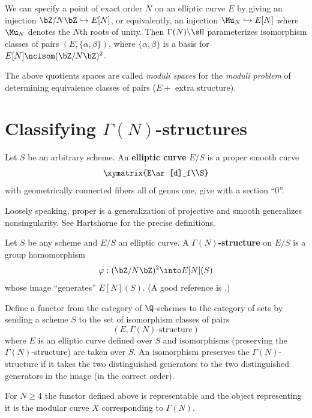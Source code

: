 \documentclass{report}
\begin{document}
We can specify a point of exact order $N$ on an elliptic curve $E$ by
giving an injection $\bZ/N\bZ\hookrightarrow E[N]$, or equivalently,
an injection $\Mu_N\hookrightarrow E[N]$ where $\Mu_N$ denotes the
$N$th roots of unity.  Then $\Gamma(N)\backslash\sH$ parameterizes
isomorphism classes of pairs $(E,\{\alpha,\beta\})$, where
$\{\alpha,\beta\}$ is a basis for $E[N]\ncisom(\bZ/N\bZ)^2$.

The above quotients spaces are called {\em moduli spaces} for the
{\em moduli problem} of determining equivalence classes of
pairs ($E + $ extra structure). 

\section{Classifying $\Gamma(N)$-structures}
\begin{defn}
Let $S$ be an arbitrary scheme. An {\bfseries elliptic curve}
$E/S$ is a proper smooth curve
$$\xymatrix{E\ar[d]_f\\S}$$
with geometrically connected fibers all of genus one, give with a
section ``0''.
\end{defn}

Loosely speaking, proper is a generalization of projective
and smooth generalizes nonsingularity. See
Hartshorne \cite[III.10]{hartshorne}
for the precise definitions.

\begin{defn}
Let $S$ be any scheme and $E/S$ an elliptic curve.
A {\bfseries $\Gamma(N)$-structure} on $E/S$ is
a group homomorphism
$$\varphi:(\bZ/N\bZ)^2\into E[N](S)$$
whose image ``generates'' $E[N](S)$.
(A good reference is \cite[Ch.~3]{katzmazur}.)
\end{defn}

Define a functor from the category of $\Q$-schemes to the
category of sets by sending a scheme $S$ to the
set of isomorphism classes of pairs
$$(E, \Gamma(N)\text{-structure})$$%
where $E$ is an elliptic curve defined over $S$ and
isomorphisms (preserving the $\Gamma(N)$-structure) are taken
over $S$. An isomorphism preserves the $\Gamma(N)$-structure
if it takes the two distinguished generators to the two
distinguished generators in the image (in the correct order).

\begin{theorem}
For $N\geq 4$ the functor defined above is representable and
the object representing it is the modular curve $X$ corresponding
to $\Gamma(N)$.
\end{theorem}
\end{document}
